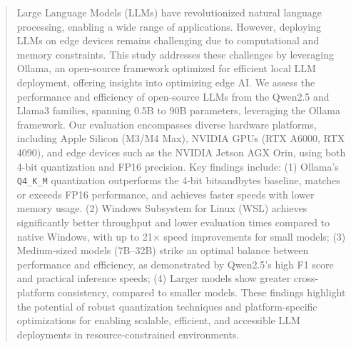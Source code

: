 \documentclass[conference]{IEEEtran}
\begin{document}
\begin{abstract}
Large Language Models (LLMs) have revolutionized natural language processing, enabling a wide range of applications. However, deploying LLMs on edge devices remains challenging due to computational and memory constraints. 
This study addresses these challenges by leveraging Ollama, an open-source framework optimized for efficient local LLM deployment, offering insights into optimizing edge AI.
We assess the performance and efficiency of open-source LLMs from the Qwen2.5 and Llama3 families, spanning 0.5B to 90B parameters, leveraging the Ollama framework. Our evaluation encompasses diverse hardware platforms, including Apple Silicon (M3/M4 Max), NVIDIA GPUs (RTX A6000, RTX 4090), and edge devices such as the NVIDIA Jetson AGX Orin, using both 4-bit quantization and FP16 precision.
Key findings include: 
(1) Ollama’s \texttt{Q4\_K\_M} quantization outperforms the 4-bit bitsandbytes baseline, matches or exceeds FP16 performance, and achieves faster speeds with lower memory usage.
(2) Windows Subsystem for Linux (WSL) achieves significantly better throughput and lower evaluation times compared to native Windows, with up to 21× speed improvements for small models; 
(3) Medium-sized models (7B–32B) strike an optimal balance between performance and efficiency, as demonstrated by Qwen2.5’s high F1 score and practical inference speeds;
(4) Larger models show greater cross-platform consistency,  compared to smaller models.
These findings highlight the potential of robust quantization techniques and platform-specific optimizations for enabling scalable, efficient, and accessible LLM deployments in resource-constrained environments.

\end{abstract}
\end{document}
